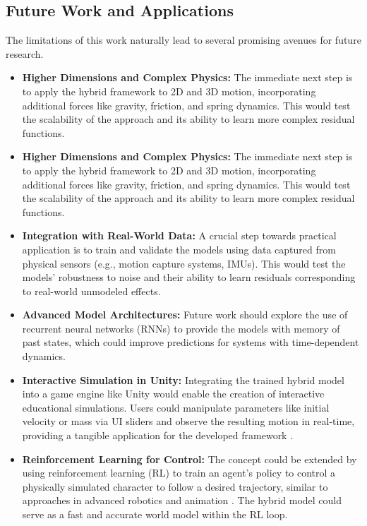 \documentclass[conference]{IEEEtran}
\begin{document}
\subsection{Future Work and Applications}
The limitations of this work naturally lead to several promising avenues for future research.
\begin{itemize}
    \item \textbf{Higher Dimensions and Complex Physics:} The immediate next step is to apply the hybrid framework to 2D and 3D motion, incorporating additional forces like gravity, friction, and spring dynamics. This would test the scalability of the approach and its ability to learn more complex residual functions.
    \item \textbf{Higher Dimensions and Complex Physics:} The immediate next step is to apply the hybrid framework to 2D and 3D motion, incorporating additional forces like gravity, friction, and spring dynamics. This would test the scalability of the approach and its ability to learn more complex residual functions.
    \item \textbf{Integration with Real-World Data:} A crucial step towards practical application is to train and validate the models using data captured from physical sensors (e.g., motion capture systems, IMUs). This would test the models' robustness to noise and their ability to learn residuals corresponding to real-world unmodeled effects.
    \item \textbf{Advanced Model Architectures:} Future work should explore the use of recurrent neural networks (RNNs) to provide the models with memory of past states, which could improve predictions for systems with time-dependent dynamics.
    \item \textbf{Interactive Simulation in Unity:} Integrating the trained hybrid model into a game engine like Unity would enable the creation of interactive educational simulations. Users could manipulate parameters like initial velocity or mass via UI sliders and observe the resulting motion in real-time, providing a tangible application for the developed framework \cite{b2}.
    \item \textbf{Reinforcement Learning for Control:} The concept could be extended by using reinforcement learning (RL) to train an agent's policy to control a physically simulated character to follow a desired trajectory, similar to approaches in advanced robotics and animation \cite{b6}. The hybrid model could serve as a fast and accurate world model within the RL loop.
\end{itemize}
\end{document}
